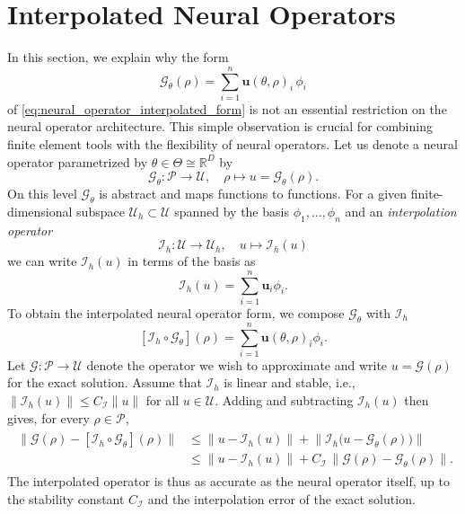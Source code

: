 \documentclass{article} %
\begin{document}
\section{Interpolated Neural Operators}
In this section, we explain why the form
\begin{equation*}
   \mathcal G_\theta(\rho) 
   =
   \sum_{i=1}^n\mathbf u(\theta, \rho)_i\,\phi_i
\end{equation*}
of \eqref{eq:neural_operator_interpolated_form} is not an essential restriction on the neural operator architecture. This simple observation is crucial for combining finite element tools with the flexibility of neural operators. Let us denote a neural operator parametrized by $\theta\in\Theta\cong \mathbb R^D$ by
\begin{equation*}
   \mathcal G_\theta:\mathcal P \to \mathcal U, \quad \rho \mapsto u = \mathcal G_\theta(\rho).
\end{equation*}
On this level $\mathcal G_\theta$ is abstract and maps functions to functions. For a given finite-dimensional subspace $\mathcal U_h\subset \mathcal U$ spanned by the basis $\phi_1,\dots,\phi_n$ and an \emph{interpolation operator}
\begin{equation*}
   \mathcal I_h : \mathcal U \to \mathcal U_h, \quad u\mapsto \mathcal I_h(u)
\end{equation*}
we can write $\mathcal I_h(u)$ in terms of the basis as
\begin{equation*}
   \mathcal I_h(u)
   =
   \sum_{i=1}^n \mathbf u_i\phi_i.
\end{equation*}
To obtain the interpolated neural operator form, we compose $\mathcal G_\theta$ with $\mathcal I_h$
\begin{equation}\label{eq:appendix_interpolated_form}
   [\mathcal I_h \circ \mathcal G_\theta](\rho)
   =
   \sum_{i=1}^n \mathbf u(\theta, \rho)_i \phi_i.
\end{equation}
Let $\mathcal G:\mathcal P\to\mathcal U$ denote the operator we wish to approximate and write $u = \mathcal G(\rho)$ for the exact solution. Assume that $\mathcal I_h$ is linear and stable, i.e., $\|\mathcal I_h(u)\|\leq C_{\mathcal I}\|u\|$ for all $u\in\mathcal U$. Adding and subtracting $\mathcal I_h(u)$ then gives, for every $\rho\in\mathcal P$,
\begin{align}\label{eq:appendix_interpolation_estimate}
   \begin{split}
      \big\| \mathcal G(\rho) - [\mathcal I_h\circ\mathcal G_\theta](\rho) \big\|
      &\leq
      \big\| u - \mathcal I_h(u) \big\|
      +
      \big\| \mathcal I_h\big(u - \mathcal G_\theta(\rho)\big) \big\|
      \\
      &\leq
      \big\| u - \mathcal I_h(u) \big\|
      +
      C_{\mathcal I}\,\big\| \mathcal G(\rho) - \mathcal G_\theta(\rho) \big\|.
   \end{split}
\end{align}
The interpolated operator is thus as accurate as the neural operator itself, up to the stability constant $C_{\mathcal I}$ and the interpolation error of the exact solution.
\end{document}

